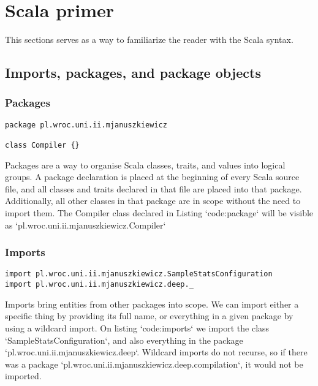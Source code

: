 \chapter{Scala primer}

This sections serves as a way to familiarize the reader with the Scala syntax.


\section{Imports, packages, and package objects}

\subsection{Packages}

\begin{lstlisting}[caption=Package definition, label=code:package, escapechar=|, float, floatplacement=H]
package pl.wroc.uni.ii.mjanuszkiewicz

class Compiler {}  
\end{lstlisting}

Packages are a way to organise Scala classes, traits, and values into logical groups.
A package declaration is placed at the beginning of every Scala source file, and all classes and traits declared in that file are placed into that package.
Additionally, all other classes in that package are in scope without the need to import them.
The Compiler class declared in Listing `code:package` will be visible as `pl.wroc.uni.ii.mjanuszkiewicz.Compiler`

\subsection{Imports}

\begin{lstlisting}[caption=imports, label=code:imports, escapechar=|, float, floatplacement=H]
import pl.wroc.uni.ii.mjanuszkiewicz.SampleStatsConfiguration
import pl.wroc.uni.ii.mjanuszkiewicz.deep._
\end{lstlisting}

Imports bring entities from other packages into scope.
We can import either a specific thing by providing its full name, or everything in a given package by using a wildcard import.
On listing `code:imports` we import the class `SampleStatsConfiguration`, and also everything in the package `pl.wroc.uni.ii.mjanuszkiewicz.deep`.
Wildcard imports do not recurse, so if there was a package `pl.wroc.uni.ii.mjanuszkiewicz.deep.compilation`, it would not be imported.

